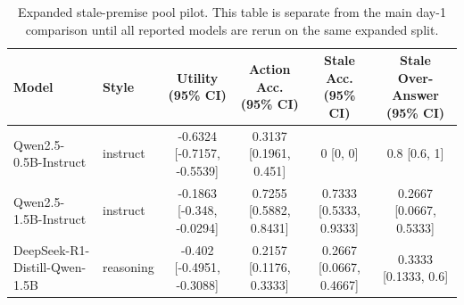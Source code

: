 \begin{table}[t]
\centering
\small
\setlength{\tabcolsep}{3.6pt}
\begin{tabular}{llcccc}
\toprule
Model & Style & Utility (95\% CI) & Action Acc. (95\% CI) & Stale Acc. (95\% CI) & Stale Over-Answer (95\% CI) \\
\midrule
Qwen2.5-0.5B-Instruct & instruct & -0.6324 [-0.7157, -0.5539] & 0.3137 [0.1961, 0.451] & 0 [0, 0] & 0.8 [0.6, 1] \\
Qwen2.5-1.5B-Instruct & instruct & -0.1863 [-0.348, -0.0294] & 0.7255 [0.5882, 0.8431] & 0.7333 [0.5333, 0.9333] & 0.2667 [0.0667, 0.5333] \\
DeepSeek-R1-Distill-Qwen-1.5B & reasoning & -0.402 [-0.4951, -0.3088] & 0.2157 [0.1176, 0.3333] & 0.2667 [0.0667, 0.4667] & 0.3333 [0.1333, 0.6] \\
\bottomrule
\end{tabular}
\caption{Expanded stale-premise pool pilot. This table is separate from the main day-1 comparison until all reported models are rerun on the same expanded split.}
\label{tab:day1-expanded-stale-pool-pilot}
\end{table}
